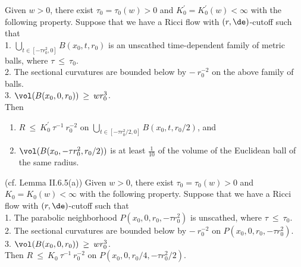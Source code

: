 \begin{lemma}
  \label{lem:kl-earlier-scalar-curvature-bounds-smaller-balls-from-lower-curvature-bound-estimates-scalar-curvature}
 \label{I.11.6(a)}
Given $w > 0$, there exist $\tau_0 = \tau_0(w) > 0$ and
$K_0^\prime = K_0^\prime(w) < \infty$
with the following property. Suppose that we have
a Ricci flow with $(r,\de)$-cutoff such that \\
1. $\bigcup_{t \in
[-\tau r_0^2, 0]} B(x_0, t, r_0)$ is an unscathed time-dependent family of
metric balls, where $\tau \: \le \: \tau_0$. \\
2. The sectional curvatures are bounded below by $- \: r_0^{-2}$
on the
above family of balls. \\
3. $\vol(B(x_0, 0, r_0)) \: \ge \: w r_0^3$. \\

Then
\begin{enumerate}
\item
$R \: \le \: K_0^\prime \: \tau^{-1} \: r_0^{-2}$
on $\bigcup_{ t \in [- \tau r_0^2/2, 0]} B(x_0, t, r_0/2)$, and
\item $\vol(B(x_0, -\tau r_0^2, r_0/2))$ is at least $\frac{1}{10}$
of the volume of the Euclidean ball of the same radius.
\end{enumerate}
\end{lemma}

\begin{lemma}
  \label{lem:kl-earlier-scalar-curvature-bounds-smaller-balls-from-lower-curvature-bound-estimates-scalar-curvature-4}
 \label{II.6.5(a)}
(cf. Lemma II.6.5(a))
Given $w > 0$, there exist $\tau_0 = \tau_0(w) > 0$ and $K_0 =
K_0(w) < \infty$ with the following property. Suppose that we have
a Ricci flow with $(r,\de)$-cutoff such that \\
1. The parabolic neighborhood
$P(x_0, 0, r_0, -\tau r_0^2)$ is unscathed,
where $\tau \: \le \: \tau_0$. \\
2. The sectional curvatures are bounded below by $- \: r_0^{-2}$ on
$P(x_0, 0, r_0, -\tau r_0^2)$. \\
3. $\vol(B(x_0, 0, r_0)) \: \ge \: wr_0^3$. \\

Then $R \: \le \: K_0 \: \tau^{-1} \: r_0^{-2}$ on
$P(x_0, 0, r_0/4, -\tau r_0^2/2)$.
\end{lemma}

